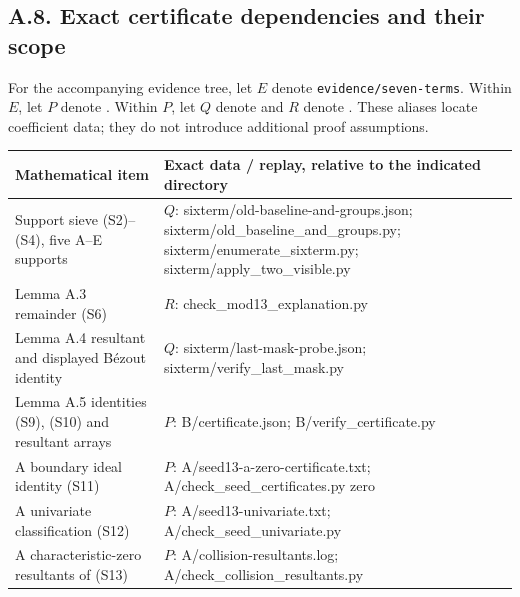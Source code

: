 \documentclass[
  british,
  10pt,
  a4paper,
]{article}
\newcounter{none} %
\begin{document}
\subsection*{A.8. Exact certificate dependencies and their
scope}\label{a.8.-exact-certificate-dependencies-and-their-scope}

For the accompanying evidence tree, let \(E\) denote
\texttt{evidence/seven-terms}. Within \(E\), let \(P\) denote
. Within \(P\), let \(Q\) denote
 and \(R\) denote
. These aliases locate
coefficient data; they do not introduce additional proof assumptions.

{\def\LTcaptype{none} %
\begin{longtable}[]{@{}
  >{\raggedright\arraybackslash}p{}
  >{\raggedright\arraybackslash}p{}@{}}
\toprule\noalign{}
\begin{minipage}[b]{\linewidth}\raggedright
Mathematical item
\end{minipage} & \begin{minipage}[b]{\linewidth}\raggedright
Exact data / replay, relative to the indicated directory
\end{minipage} \\
\midrule\noalign{}
\endhead
\bottomrule\noalign{}
\endlastfoot
Support sieve (S2)--(S4), five A--E supports & \(Q\):
sixterm/old-baseline-and-groups.json;
sixterm/old\_baseline\_and\_groups.py; sixterm/enumerate\_sixterm.py;
sixterm/apply\_two\_visible.py \\
Lemma A.3 remainder (S6) & \(R\): check\_mod13\_explanation.py \\
Lemma A.4 resultant and displayed Bézout identity & \(Q\):
sixterm/last-mask-probe.json; sixterm/verify\_last\_mask.py \\
Lemma A.5 identities (S9), (S10) and resultant arrays & \(P\):
B/certificate.json; B/verify\_certificate.py \\
A boundary ideal identity (S11) & \(P\):
A/seed13-a-zero-certificate.txt; A/check\_seed\_certificates.py zero \\
A univariate classification (S12) & \(P\): A/seed13-univariate.txt;
A/check\_seed\_univariate.py \\
A characteristic-zero resultants of (S13) & \(P\):
A/collision-resultants.log; A/check\_collision\_resultants.py \\

\end{longtable}}
\end{document}

